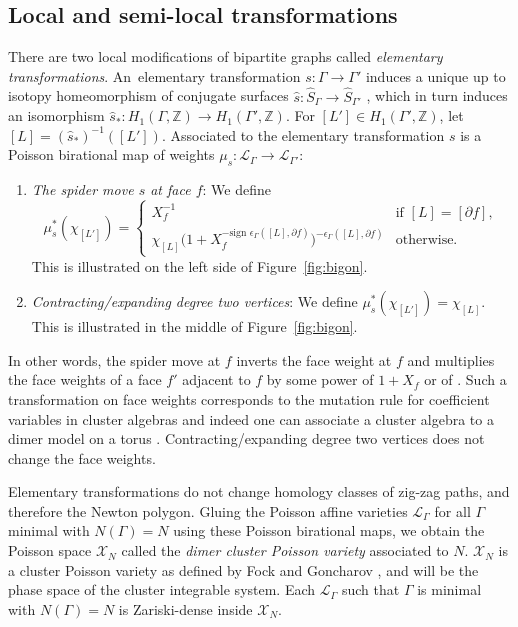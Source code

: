 \documentclass[pdftex]{sigma}
\numberwithin{equation}{section}
\newcommand{\Z}{{\mathbb Z}}
\newcommand{\ra}{\rightarrow}
\begin{document}
\subsection{Local and semi-local transformations}
	
There are two local modifications of bipartite graphs called \emph{elementary transformations}. An~elementary transformation $s\colon \Gamma \ra \Gamma'$ induces a unique up to isotopy homeomorphism of conjugate surfaces {$\hat s \colon \widehat S_\Gamma \ra \widehat S_{\Gamma'}$} \cite[Lemma 4.1]{GK13}, which in turn induces an isomorphism $\hat s_*\colon H_1(\Gamma,\Z) \ra H_1(\Gamma',\Z)$. For $[L'] \in H_1(\Gamma',\Z)$, let $[L]=(\hat s_*)^{-1}([L'])$. Associated to the elementary transformation $s$ is a Poisson birational map of weights $\mu_s\colon \mathcal L_\Gamma \ra \mathcal L_{\Gamma'}$:
	\begin{enumerate}\itemsep=0pt
		\item \emph{The spider move $s$ at face $f$}: We define \[\mu_{s}^*(\chi_{[L']})=\begin{cases}
			X_f^{-1} &\text{if $[L]=[\partial f]$},\\
			\chi_{[L]}\big(1+X_f^{-\text{sign }\epsilon_\Gamma([L],\partial f)}\big)^{-\epsilon_\Gamma([L],\partial f)} & \text{otherwise.}
		\end{cases}
		\]
		This is illustrated on the left side of Figure~\ref{fig:bigon}.
		\item \emph{Contracting/expanding degree two vertices}: We define $\mu_s^*(\chi_{[L']})=\chi_{[L]}$. This is illustrated in the middle of Figure~\ref{fig:bigon}.
	\end{enumerate}
	In other words, the spider move at $f$ inverts the face weight at $f$ and multiplies the face weights of a face $f'$ adjacent to $f$ by some power of $1+X_f$ or of . Such a transformation on face weights corresponds to the mutation rule for coefficient variables in cluster algebras \cite{FG, FZ} and indeed one can associate a cluster algebra to a dimer model on a torus \cite{GK13}. Contracting/expanding degree two vertices does not change the face weights.
	
	
	Elementary transformations do not change homology classes of zig-zag paths, and therefore the Newton polygon. Gluing the Poisson affine varieties $\mathcal L_\Gamma$ for all $\Gamma$ minimal with $N(\Gamma)=N$ using these Poisson birational maps, we obtain the Poisson space $\mathcal X_N$ called the \emph{dimer cluster Poisson variety} associated to $N$. $\mathcal X_N$ is a cluster Poisson variety as defined by Fock and Goncharov \cite{FG}, and will be the phase space of the cluster integrable system. {Each $\mathcal L_\Gamma$ such that $\Gamma$ is minimal with $N(\Gamma)=N$ is Zariski-dense inside $\mathcal X_N$.}
	
\end{document}

